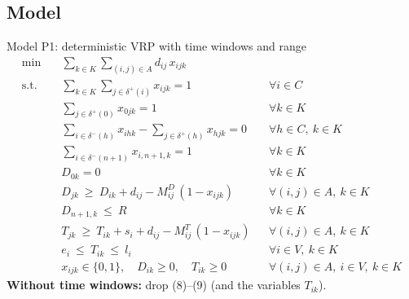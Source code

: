 \documentclass[11pt,a4paper]{article}
\theoremstyle{definition}
\newcommand{\dout}{\delta^{+}}
\newcommand{\din}{\delta^{-}}
\newcommand{\sumk}{\sum_{k\in K}}
\newcommand{\sumA}{\sum_{(i,j)\in A}}
\begin{document}
\subsection{Model}
\begin{modelbox}{Model P1: deterministic VRP with time windows and range}
\begin{align*}
\min\quad & \sumk\sumA d_{ij}\,x_{ijk} \tag{0}\\[3pt]
\text{s.t.}\quad
& \sumk\sum_{j\in\dout(i)} x_{ijk}=1 && \forall i\in C \tag{1}\\
& \sum_{j\in\dout(0)} x_{0jk}=1 && \forall k\in K \tag{2}\\
& \sum_{i\in\din(h)} x_{ihk}-\sum_{j\in\dout(h)} x_{hjk}=0 && \forall h\in C,\ k\in K \tag{3}\\
& \sum_{i\in\din(n+1)} x_{i,n+1,k}=1 && \forall k\in K \tag{4}\\
& D_{0k}=0 && \forall k\in K \tag{5}\\
& D_{jk}\ \ge\ D_{ik}+d_{ij}-M^D_{ij}\,(1-x_{ijk}) && \forall (i,j)\in A,\ k\in K \tag{6}\\
& D_{n+1,k}\ \le\ R && \forall k\in K \tag{7}\\
& T_{jk}\ \ge\ T_{ik}+s_i+d_{ij}-M^T_{ij}\,(1-x_{ijk}) && \forall (i,j)\in A,\ k\in K \tag{8}\\
& e_i\ \le\ T_{ik}\ \le\ l_i && \forall i\in V,\ k\in K \tag{9}\\
& x_{ijk}\in\{0,1\},\quad D_{ik}\ge0,\quad T_{ik}\ge0 && \forall (i,j)\in A,\ i\in V,\ k\in K \tag{10}
\end{align*}
\textbf{Without time windows:} drop (8)--(9) (and the variables $T_{ik}$).
\end{modelbox}
\end{document}
